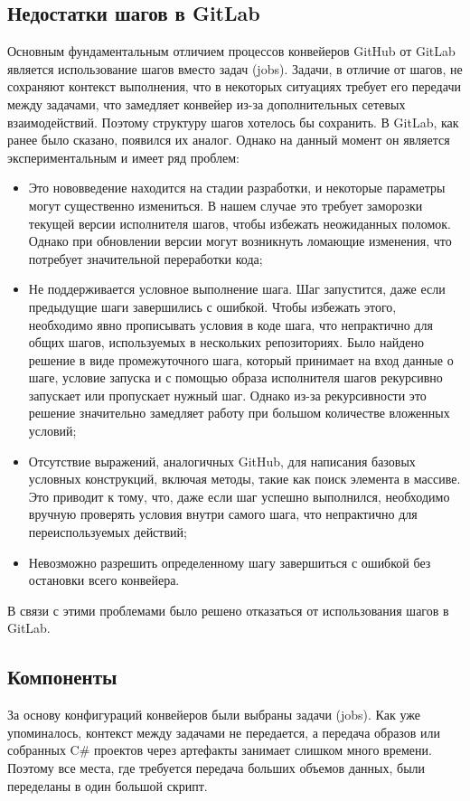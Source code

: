 \subsection{Недостатки шагов в GitLab} \label{subsec:gitlab-steps-problems}
Основным фундаментальным отличием процессов конвейеров GitHub от GitLab является использование шагов вместо задач (jobs).
Задачи, в отличие от шагов, не сохраняют контекст выполнения, что в некоторых ситуациях требует его передачи между задачами,
что замедляет конвейер из-за дополнительных сетевых взаимодействий.
Поэтому структуру шагов хотелось бы сохранить.
В GitLab, как ранее было сказано, появился их аналог.
Однако на данный момент он является экспериментальным и имеет ряд проблем:
\begin{itemize}
  \item Это нововведение находится на стадии разработки, и некоторые параметры могут существенно измениться.
        В нашем случае это требует заморозки текущей версии исполнителя шагов, чтобы избежать неожиданных поломок.
        Однако при обновлении версии могут возникнуть ломающие изменения, что потребует значительной переработки кода;
  \item Не поддерживается условное выполнение шага.
        Шаг запустится, даже если предыдущие шаги завершились с ошибкой.
        Чтобы избежать этого, необходимо явно прописывать условия в коде шага, что непрактично для общих шагов, используемых в нескольких репозиториях.
        Было найдено решение в виде промежуточного шага, который принимает на вход данные о шаге, условие запуска и с помощью образа исполнителя шагов рекурсивно запускает или пропускает нужный шаг.
        Однако из-за рекурсивности это решение значительно замедляет работу при большом количестве вложенных условий;
  \item Отсутствие выражений, аналогичных GitHub, для написания базовых условных конструкций, включая методы, такие как поиск элемента в массиве.
        Это приводит к тому, что, даже если шаг успешно выполнился, необходимо вручную проверять условия внутри самого шага, что непрактично для переиспользуемых действий;
  \item Невозможно разрешить определенному шагу завершиться с ошибкой без остановки всего конвейера.
\end{itemize}

В связи с этими проблемами было решено отказаться от использования шагов в GitLab.

\subsection{Компоненты} \label{subsec:components}
За основу конфигураций конвейеров были выбраны задачи (jobs).
Как уже упоминалось, контекст между задачами не передается, а передача образов или собранных C\# проектов через артефакты занимает слишком много времени.
Поэтому все места, где требуется передача больших объемов данных, были переделаны в один большой скрипт.

